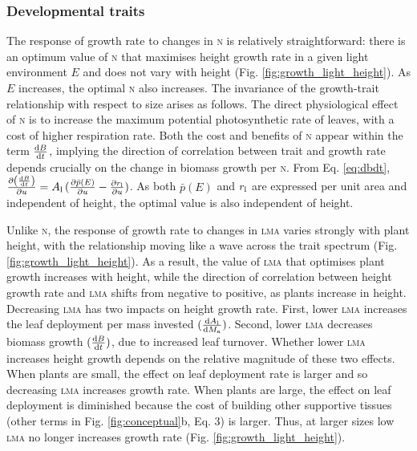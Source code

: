 \documentclass[9pt,twocolumn,twoside,lineno]{pnas-new}
\newcommand{\lma}{\textsc{lma}}
\newcommand{\nitrogen}{\textsc{n}}
\begin{document}
\subsubsection*{Developmental traits}  The response of growth rate to changes in {\nitrogen} is relatively straightforward: there is an optimum value of {\nitrogen} that maximises height growth rate in a given light environment $E$ and does not vary with height (Fig. \ref{fig:growth_light_height}). As $E$ increases, the optimal {\nitrogen} also increases. The invariance of the growth-trait relationship with respect to size arises as follows. The direct physiological effect of {\nitrogen} is to increase the maximum potential photosynthetic rate of leaves, with a cost of higher respiration rate. Both the cost and benefits of {\nitrogen} appear within the term $\frac{ {\rm d}B}{{\rm d}t}$, implying the direction of correlation between trait and growth rate depends crucially on the change in biomass growth per {\nitrogen}.
From Eq. \ref{eq:dbdt}, $\frac{\partial \left( \frac{ {\rm d}B} {{\rm d}t}\right)}{\partial
u} = A_{\rm l} \, (\frac{ \partial \bar{p}(E)}{\partial
u}  - \frac{ \partial r_{\rm l}}{\partial
u} )$. As both $\bar{p}(E)$ and $r_{\rm l}$ are expressed per unit area and independent of height, the optimal value is also independent of height.

Unlike {\nitrogen}, the response of growth rate to changes in {\lma} varies strongly with plant height, with the relationship moving like a wave across the trait spectrum (Fig. \ref{fig:growth_light_height}). As a result, the value of {\lma} that optimises plant growth increases with height, while the direction of correlation between height growth rate and {\lma} shifts from negative to positive, as plants increase in height. Decreasing {\lma} has two impacts on height growth rate. First, lower {\lma} increases the leaf deployment per mass invested $(\frac{{\rm d}A_{\rm l}}{{\rm d}M_{\rm a}})$. Second, lower {\lma} decreases biomass growth $(\frac{{\rm d}B}{{\rm d}t})$, due to increased leaf turnover. Whether lower {\lma} increases height growth depends on the relative magnitude of these two effects. When plants are small, the effect on leaf deployment rate is larger and so decreasing {\lma} increases growth rate. When plants are large, the effect on leaf deployment is diminished because the cost of building other supportive tissues (other terms in Fig. \ref{fig:conceptual}b, Eq. {\color{pnasbluetext}3}) is larger. Thus, at larger sizes low {\lma} no longer increases growth rate (Fig. \ref{fig:growth_light_height}).
\end{document}
